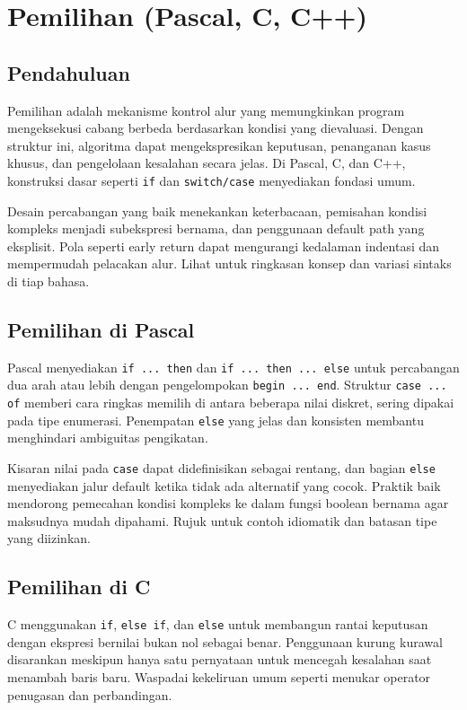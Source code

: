 \documentclass[../main.tex]{subfiles}
\begin{document}
\chapter{Pemilihan (Pascal, C, C++)}
\section{Pendahuluan}
Pemilihan adalah mekanisme kontrol alur yang memungkinkan program mengeksekusi cabang berbeda berdasarkan kondisi yang dievaluasi. Dengan struktur ini, algoritma dapat mengekspresikan keputusan, penanganan kasus khusus, dan pengelolaan kesalahan secara jelas. Di Pascal, C, dan C++, konstruksi dasar seperti \texttt{if} dan \texttt{switch/case} menyediakan fondasi umum.

Desain percabangan yang baik menekankan keterbacaan, pemisahan kondisi kompleks menjadi subekspresi bernama, dan penggunaan default path yang eksplisit. Pola seperti early return dapat mengurangi kedalaman indentasi dan mempermudah pelacakan alur. Lihat \textcite{pascal-tutorial-wikibooks,gnu-c-manual,cpp-reference} untuk ringkasan konsep dan variasi sintaks di tiap bahasa.

\section{Pemilihan di Pascal}
Pascal menyediakan \texttt{if ... then} dan \texttt{if ... then ... else} untuk percabangan dua arah atau lebih dengan pengelompokan \texttt{begin ... end}. Struktur \texttt{case ... of} memberi cara ringkas memilih di antara beberapa nilai diskret, sering dipakai pada tipe enumerasi. Penempatan \texttt{else} yang jelas dan konsisten membantu menghindari ambiguitas pengikatan.

Kisaran nilai pada \texttt{case} dapat didefinisikan sebagai rentang, dan bagian \texttt{else} menyediakan jalur default ketika tidak ada alternatif yang cocok. Praktik baik mendorong pemecahan kondisi kompleks ke dalam fungsi boolean bernama agar maksudnya mudah dipahami. Rujuk \textcite{pascal-tutorial-wikibooks} untuk contoh idiomatik dan batasan tipe yang diizinkan.

\section{Pemilihan di C}
C menggunakan \texttt{if}, \texttt{else if}, dan \texttt{else} untuk membangun rantai keputusan dengan ekspresi bernilai bukan nol sebagai benar. Penggunaan kurung kurawal disarankan meskipun hanya satu pernyataan untuk mencegah kesalahan saat menambah baris baru. Waspadai kekeliruan umum seperti menukar operator penugasan dan perbandingan.
\end{document}

